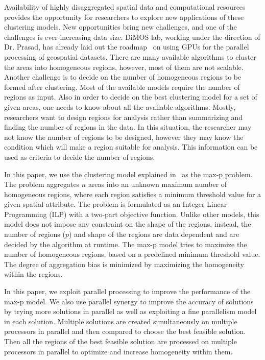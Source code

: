 \documentclass[conference]{IEEEtran}
\begin{document}
Availability of highly disaggregated spatial data and computational resources
provides the opportunity for researchers to explore new applications of these
clustering models. New opportunities bring new challenges, and one of the
challenges is ever-increasing data size. DiMOS lab, working under the direction of Dr. Prasad, has already laid out the roadmap~\cite{r34,r35} on using GPUs for the parallel processing of geospatial datasets. There are many available algorithms to cluster the areas into homogeneous regions, however, most of them are not
scalable. Another challenge is to decide on the number of homogeneous regions to
be formed after clustering. Most of the available models require the number of
regions as input. Also in order to decide on the best clustering model for a set
of given areas, one needs to know about all the available algorithms. Mostly,
researchers want to design regions for analysis rather than summarizing and
finding the number of regions in the data. In this situation, the researcher may not
know the number of regions to be designed, however they may know the condition
which will make a region suitable for analysis. This information can be used as
criteria to decide the number of regions.

In this paper, we use the clustering model explained in~\cite{r1} as the max-p
problem. The problem aggregates $n$ areas into an unknown maximum number of
homogeneous regions, where each region satisfies a minimum threshold value for a
given spatial attribute. The problem is formulated as an Integer Linear
Programming (ILP) with a two-part objective function. Unlike other models, this
model does not impose any constraint on the shape of the regions, instead, the
number of regions ($p$) and shape of the regions are data dependent and are
decided by the algorithm at runtime. The max-p model tries to maximize the
number of homogeneous regions, based on a predefined minimum threshold value.
The degree of aggregation bias is minimized by maximizing the homogeneity within
the regions.

In this paper, we exploit parallel processing to improve the
performance of the max-p model. We also use parallel synergy to improve the
accuracy of solutions by trying more solutions in parallel as well as exploiting
a fine parallelism model in each solution. Multiple solutions are created
simultaneously on multiple processors in parallel and then compared to choose
the best feasible solution. Then all the regions of the best feasible solution
are processed on multiple processors in parallel to optimize and increase
homogeneity within them.
\end{document}
